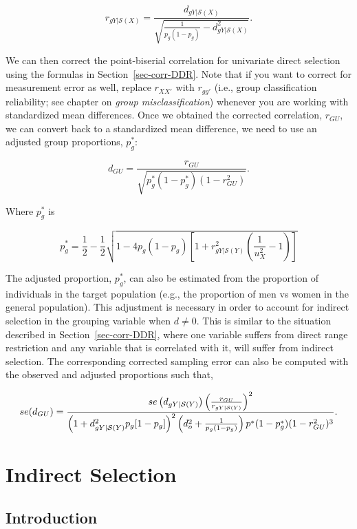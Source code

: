 \documentclass[
  letterpaper,
  DIV=11,
  numbers=noendperiod]{scrreprt}
\begin{document}
\[
r_{gY|\mathcal{S}(X)} = \frac{d_{gY|\mathcal{S}(X)}}{\sqrt{\frac{1}{p_g(1-p_g)}-d_{gY|\mathcal{S}(X)}^2}}.
\]

We can then correct the point-biserial correlation for univariate direct
selection using the formulas in Section~\ref{sec-corr-DDR}. Note that if
you want to correct for measurement error as well, replace \(r_{XX'}\)
with \(r_{gg'}\) (i.e., group classification reliability; see chapter on
\emph{group misclassification}) whenever you are working with
standardized mean differences. Once we obtained the corrected
correlation, \(r_{GU}\), we can convert back to a standardized mean
difference, we need to use an adjusted group proportions, \(p_g^*\):

\[
d_{GU} = \frac{r_{GU}}{\sqrt{p_g^*\left(1-p_g^*\right)\left(1-r_{GU}^2\right)}}.
\]

Where \(p_g^*\) is

\[
p_g^* = \frac{1}{2}-\frac{1}{2}\sqrt{1-4p_g(1-p_g)\left[1+r_{gY|\mathcal{S}(Y)}^2\left(\frac{1}{u^2_X}-1\right)\right]}
\]

The adjusted proportion, \(p_g^*\), can also be estimated from the
proportion of individuals in the target population (e.g., the proportion
of men vs women in the general population). This adjustment is necessary
in order to account for indirect selection in the grouping variable when
\(d\neq 0\). This is similar to the situation described in
Section~\ref{sec-corr-DDR}, where one variable suffers from direct range
restriction and any variable that is correlated with it, will suffer
from indirect selection. The corresponding corrected sampling error can
also be computed with the observed and adjusted proportions such that,

\[
\small{se(d_{GU}) = \frac {se\left(d_{gY|\mathcal{S}(Y)}\right)\left(\frac{r_{GU}}{r_{gY|\mathcal{S}(Y)}}\right)^2} {\left(1+d_{gY|\mathcal{S}(Y)}^2p_g[1-p_g]\right)^2\left(d_o^2+\frac{1}{p_g(1-p_g)}\right)p^*(1-p_g^*)(1-r_{GU}^2)^3}.}
\]

\hypertarget{indirect-selection}{%
\chapter{Indirect Selection}\label{indirect-selection}}

\hypertarget{introduction-6}{%
\section{Introduction}\label{introduction-6}}
\end{document}
